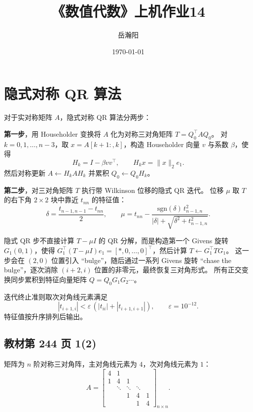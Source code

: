 \documentclass[10pt, a4paper]{article}
\title{\textbf{《数值代数》上机作业14}}
\author{岳瀚阳\quad\quad\quad\quad 3230104443}
\date{\today}
\begin{document}
\maketitle

\section{隐式对称 QR 算法}

对于实对称矩阵 $A$，隐式对称 QR 算法分两步：

\textbf{第一步}，用 Householder 变换将 $A$ 化为对称三对角矩阵 $T = Q_0^{\!\top} A Q_0$。
对 $k = 0, 1, \ldots, n-3$，取 $x = A[k+1:\!,k]$，构造 Householder 向量 $v$ 与系数 $\beta$，使得
\[
H_k = I - \beta v v^{\!\top}, \qquad H_k x = \|x\|_2 e_1.
\]
然后对称更新 $A \leftarrow H_k A H_k$ 并累积 $Q_0 \leftarrow Q_0 H_k$。

\textbf{第二步}，对三对角矩阵 $T$ 执行带 Wilkinson 位移的隐式 QR 迭代。
位移 $\mu$ 取 $T$ 的右下角 $2\times2$ 块中靠近 $t_{nn}$ 的特征值：
\[
\delta = \frac{t_{n-1,n-1} - t_{nn}}{2}, \qquad
\mu = t_{nn} - \frac{\mathrm{sgn}(\delta)\,t_{n-1,n}^2}{|\delta| + \sqrt{\delta^2 + t_{n-1,n}^2}}.
\]

隐式 QR 步不直接计算 $T - \mu I$ 的 QR 分解，而是构造第一个 Givens 旋转 $G_1(0,1)$，使得 $G_1^{\!\top}(T - \mu I)e_1 = [\ast, 0, \ldots, 0]^{\!\top}$，然后计算 $T \leftarrow G_1^{\!\top} T G_1$。
这一步会在 $(2,0)$ 位置引入 ``bulge''，随后通过一系列 Givens 旋转 ``chase the bulge''，逐次消除 $(i+2,i)$ 位置的非零元，最终恢复三对角形式。
所有正交变换同步累积到特征向量矩阵 $Q = Q_0 G_1 G_2 \cdots$。

迭代终止准则取次对角线元素满足
\[
|t_{i+1,i}| < \varepsilon\,(|t_{ii}| + |t_{i+1,i+1}|), \qquad \varepsilon = 10^{-12}.
\]
特征值按升序排列后输出。

\subsection{教材第 244 页 1(2)}

矩阵为 $n$ 阶对称三对角阵，主对角线元素为 $4$，次对角线元素为 $1$：
\[
A = \begin{bmatrix}
4 & 1 & & & \\
1 & 4 & 1 & & \\
& \ddots & \ddots & \ddots & \\
& & 1 & 4 & 1 \\
& & & 1 & 4
\end{bmatrix}_{n\times n}.
\]
\end{document}

